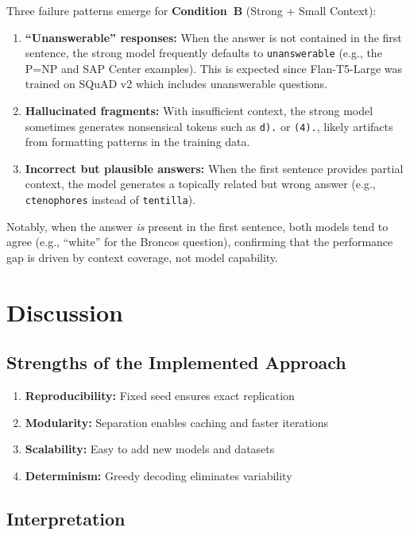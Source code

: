 \documentclass[11pt,a4paper]{article}
\begin{document}
\noindent Three failure patterns emerge for \textbf{Condition~B} (Strong + Small Context):

\begin{enumerate}
    \item \textbf{``Unanswerable'' responses:} When the answer is not contained in the first sentence, the strong model frequently defaults to \texttt{unanswerable} (e.g., the P=NP and SAP Center examples). This is expected since Flan-T5-Large was trained on SQuAD v2 which includes unanswerable questions.
    \item \textbf{Hallucinated fragments:} With insufficient context, the strong model sometimes generates nonsensical tokens such as \texttt{d).} or \texttt{(4).}, likely artifacts from formatting patterns in the training data.
    \item \textbf{Incorrect but plausible answers:} When the first sentence provides partial context, the model generates a topically related but wrong answer (e.g., \texttt{ctenophores} instead of \texttt{tentilla}).
\end{enumerate}

\noindent Notably, when the answer \textit{is} present in the first sentence, both models tend to agree (e.g., ``white'' for the Broncos question), confirming that the performance gap is driven by context coverage, not model capability.

\section{Discussion}

\subsection{Strengths of the Implemented Approach}

\begin{enumerate}
    \item \textbf{Reproducibility:} Fixed seed ensures exact replication
    \item \textbf{Modularity:} Separation enables caching and faster iterations
    \item \textbf{Scalability:} Easy to add new models and datasets
    \item \textbf{Determinism:} Greedy decoding eliminates variability
\end{enumerate}

\subsection{Interpretation}
\end{document}
